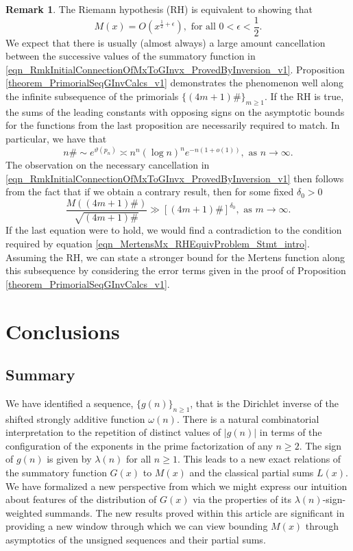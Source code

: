 \documentclass[11pt,reqno,a4letter]{article}
\newcommand{\hlocalref}[1]{\hyperref[#1]{\ref{#1}}}
\numberwithin{equation}{section}
\numberwithin{figure}{section}
\numberwithin{table}{section}
\theoremstyle{plain}
\numberwithin{theorem}{section}
\theoremstyle{definition}
\newtheorem{remark}[theorem]{Remark}
\begin{document}
\begin{remark}
\label{remark_LocalCancellationWithGxAlongThePrimorialsUnderTheRH} 
The Riemann hypothesis (RH) is equivalent to showing that 
\begin{equation} 
\label{eqn_MertensMx_RHEquivProblem_Stmt_intro} 
M(x) = O\left(x^{\frac{1}{2}+\epsilon}\right), \text{ for all } 0 < \epsilon < \frac{1}{2}.
\end{equation}
We expect that there is usually (almost always) 
a large amount cancellation between the successive 
values of the summatory function in 
\eqref{eqn_RmkInitialConnectionOfMxToGInvx_ProvedByInversion_v1}. 
Proposition \hlocalref{theorem_PrimorialSeqGInvCalcs_v1} 
demonstrates the phenomenon well along the infinite 
subsequence of the primorials $\{(4m+1)\#\}_{m \geq 1}$. 
If the RH is true, the sums of the leading constants with opposing signs 
on the asymptotic bounds for the functions from the last proposition 
are necessarily required to match. 
In particular, we have that 
\cite{DUSART-1999,DUSART-2010} 
\[
n\# \sim e^{\vartheta(p_n)} \asymp n^n (\log n)^n e^{-n(1+o(1))}, 
     \text{ as } n \rightarrow \infty. 
\]
The observation on the necessary cancellation in 
\eqref{eqn_RmkInitialConnectionOfMxToGInvx_ProvedByInversion_v1}
then follows from the fact that if we obtain a contrary result, 
then for some fixed $\delta_0 > 0$
\[
\frac{M((4m+1)\#)}{\sqrt{(4m+1)\#}} \gg \left[(4m+1)\#\right]^{\delta_0}, 
     \text{ as } m \rightarrow \infty. 
\]
If the last equation were to hold, we would find a contradiction to the 
condition required by equation \eqref{eqn_MertensMx_RHEquivProblem_Stmt_intro}. 
Assuming the RH, we can state a stronger bound for the 
Mertens function along this subsequence by considering the 
error terms given in the proof of 
Proposition \hlocalref{theorem_PrimorialSeqGInvCalcs_v1}. 
\end{remark}

\section{Conclusions}

\subsection{Summary}

We have identified a sequence, 
$\{g(n)\}_{n \geq 1}$, that is the Dirichlet inverse of the 
shifted strongly additive function $\omega(n)$. 
There is a natural 
combinatorial interpretation to the repetition of distinct values 
of $|g(n)|$ in terms of the configuration of the 
exponents in the prime factorization of any $n \geq 2$. 
The sign of $g(n)$ is given by $\lambda(n)$ for all $n \geq 1$. 
This leads to a new exact relations of the 
summatory function $G(x)$ to $M(x)$ and the classical partial sums $L(x)$. 
We have formalized a new perspective from which we might express 
our intuition about features of the distribution of $G(x)$ 
via the properties of its $\lambda(n)$-sign-weighted summands.
The new results proved within this article 
are significant in providing a new window through which we can view bounding $M(x)$ 
through asymptotics of the unsigned sequences and their partial sums. 
\end{document}
